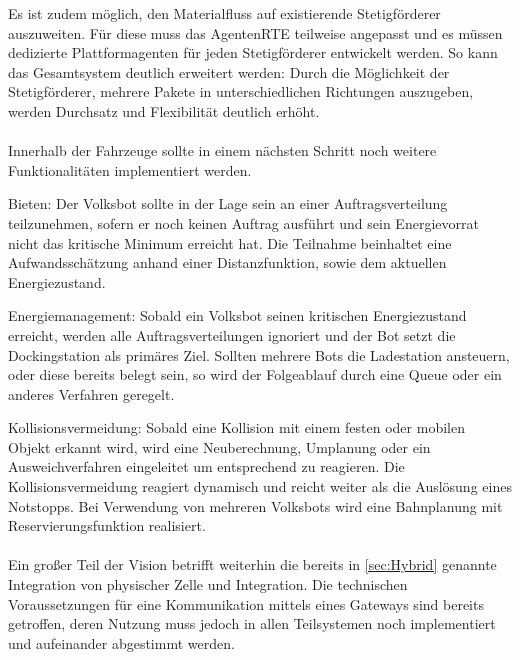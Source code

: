 Es ist zudem möglich, den Materialfluss auf existierende Stetigförderer auszuweiten. Für diese muss das AgentenRTE teilweise angepasst und es müssen dedizierte Plattformagenten für jeden Stetigförderer entwickelt werden. So kann das Gesamtsystem deutlich erweitert werden: Durch die Möglichkeit der Stetigförderer, mehrere Pakete in unterschiedlichen Richtungen auszugeben, werden Durchsatz und Flexibilität deutlich erhöht.
\\\\
Innerhalb der Fahrzeuge sollte in einem nächsten Schritt noch weitere Funktionalitäten implementiert werden.

Bieten: Der Volksbot sollte in der Lage sein an einer Auftragsverteilung teilzunehmen, sofern er noch keinen Auftrag ausführt und sein Energievorrat nicht das kritische Minimum erreicht hat. Die Teilnahme beinhaltet eine Aufwandsschätzung anhand einer Distanzfunktion, sowie dem aktuellen Energiezustand. 

Energiemanagement: Sobald ein Volksbot seinen kritischen Energiezustand erreicht, werden alle Auftragsverteilungen ignoriert und der Bot setzt die Dockingstation als primäres Ziel. Sollten mehrere Bots die Ladestation ansteuern, oder diese bereits belegt sein, so wird der Folgeablauf durch eine Queue oder ein anderes Verfahren geregelt.

Kollisionsvermeidung: Sobald eine Kollision mit einem festen oder mobilen Objekt erkannt wird, wird eine Neuberechnung, Umplanung oder ein Ausweichverfahren eingeleitet um entsprechend zu reagieren. Die Kollisionsvermeidung reagiert dynamisch und reicht weiter als die Auslösung eines Notstopps. Bei Verwendung von mehreren Volksbots wird eine Bahnplanung mit Reservierungsfunktion realisiert.
\\\\
Ein großer Teil der Vision betrifft weiterhin die bereits in \autoref{sec:Hybrid} genannte Integration von physischer Zelle und Integration. Die technischen Voraussetzungen für eine Kommunikation mittels eines Gateways sind bereits getroffen, deren Nutzung muss jedoch in allen Teilsystemen noch implementiert und aufeinander abgestimmt werden.